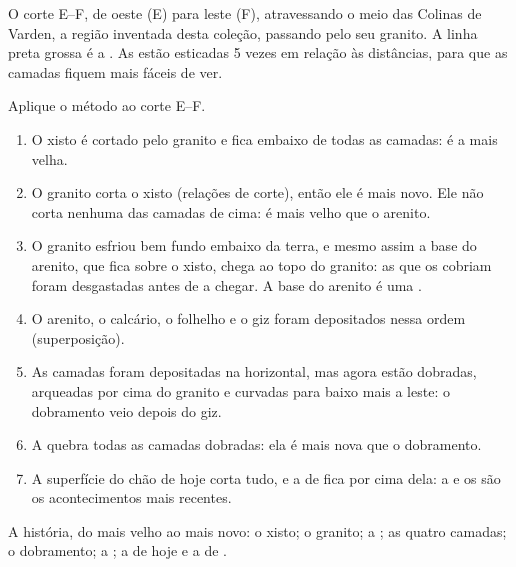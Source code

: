 \begin{omfigure}
\smallskip
{\small O corte E--F, de oeste (E) para leste (F), atravessando o meio
das Colinas de Varden, a região inventada desta coleção, passando pelo
seu granito. A linha preta grossa é a . As  estão esticadas
5 vezes em relação às distâncias, para que as camadas fiquem mais fáceis
de ver.}
\label{fig:g7:geological-time:section}
\end{omfigure}

\begin{example}\label{ex:g7:geological-time:varden}
Aplique o método ao corte E--F.
\begin{enumerate}
  \item O xisto é cortado pelo granito e fica embaixo de todas as
        camadas: é a  mais velha.
  \item O granito corta o xisto (relações de corte), então ele é mais
        novo. Ele não corta nenhuma das camadas de cima: é mais velho que
        o arenito.
  \item O granito esfriou bem fundo embaixo da terra, e mesmo assim a
        base do arenito, que fica sobre o xisto, chega ao topo do granito:
        as  que os cobriam foram desgastadas antes de a 
        chegar. A base do arenito é uma .
  \item O arenito, o calcário, o folhelho e o giz foram depositados nessa
        ordem (superposição).
  \item As camadas foram depositadas na horizontal, mas agora estão
        dobradas, arqueadas por cima do granito e curvadas para baixo
        mais a leste: o dobramento veio depois do giz.
  \item A  quebra todas as camadas dobradas: ela é mais nova que o
        dobramento.
  \item A superfície do chão de hoje corta tudo, e a  de  fica
        por cima dela: a  e os  são os acontecimentos mais
        recentes.
\end{enumerate}
A história, do mais velho ao mais novo: o xisto; o granito; a ; as
quatro camadas; o dobramento; a ; a  de hoje e a  de .
\end{example}

